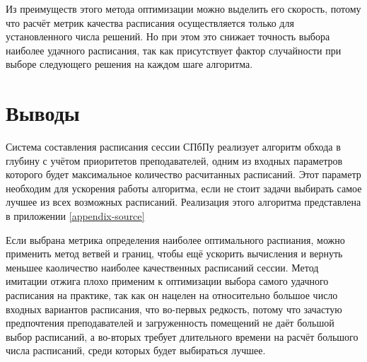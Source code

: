 Из преимуществ этого метода оптимизации можно выделить его скорость, потому что расчёт метрик качества расписания осуществляется только для установленного числа решений. Но при этом это снижает точность выбора наиболее удачного расписания, так как присутствует фактор случайности при выборе следующего решения на каждом шаге алгоритма.

\section{Выводы} \label{ch2:conclusion}

Система составления расписания сессии СПбПу реализует алгоритм обхода в глубину с учётом приоритетов преподавателей, одним из входных параметров которого будет максимальное количество расчитанных расписаний. Этот параметр необходим для ускорения работы алгоритма, если не стоит задачи выбирать самое лучшее из всех возможных расписаний. Реализация этого алгоритма представлена в приложении \ref{appendix-source}

Если выбрана метрика определения наиболее оптимального распиания, можно применить метод ветвей и границ, чтобы ещё ускорить вычисления и вернуть меньшее каоличество наиболее качественных расписаний сессии. Метод имитации отжига плохо применим к оптимизации выбора самого удачного расписания на практике, так как он нацелен на относительно большое число входных вариантов расписания, что во-первых редкость, потому что зачастую предпочтения преподавателей и загруженность помещений не даёт большой выбор расписаний, а во-вторых требует длительного времени на расчёт большого числа расписаний, среди которых будет выбираться лучшее.